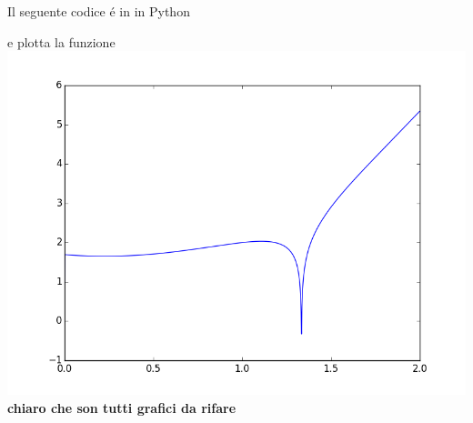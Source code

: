 Il seguente codice \'e in in Python

e plotta la funzione \\
\includegraphics[scale=0.4]{cap_1/es13/es13.png}\\
\textbf{chiaro che son tutti grafici da rifare}